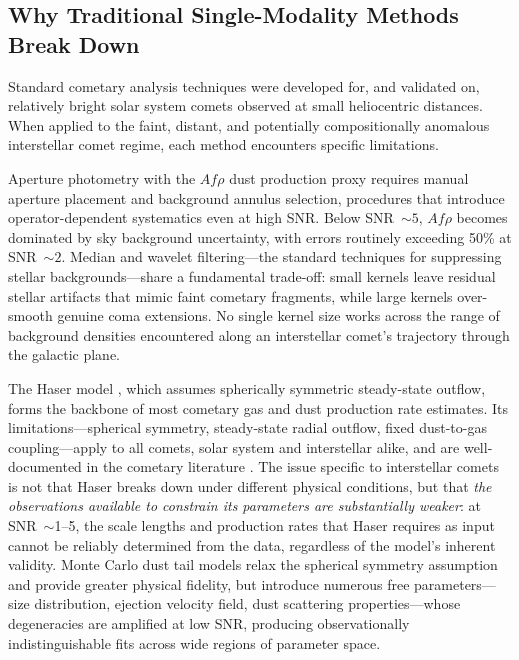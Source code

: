 \documentclass[usenatbib]{mnras}
\begin{document}
\subsection{Why Traditional Single-Modality Methods Break Down}

Standard cometary analysis techniques were developed for, and validated on, relatively bright solar system comets observed at small heliocentric distances. When applied to the faint, distant, and potentially compositionally anomalous interstellar comet regime, each method encounters specific limitations.

Aperture photometry with the $Af\rho$ dust production proxy \citep{lamy04,ahearn95} requires manual aperture placement and background annulus selection, procedures that introduce operator-dependent systematics even at high SNR. Below SNR~$\sim 5$, $Af\rho$ becomes dominated by sky background uncertainty, with errors routinely exceeding 50\% at SNR~$\sim 2$. Median and wavelet filtering---the standard techniques for suppressing stellar backgrounds---share a fundamental trade-off: small kernels leave residual stellar artifacts that mimic faint cometary fragments, while large kernels over-smooth genuine coma extensions. No single kernel size works across the range of background densities encountered along an interstellar comet's trajectory through the galactic plane.

The Haser model \citep{haser57}, which assumes spherically symmetric steady-state outflow, forms the backbone of most cometary gas and dust production rate estimates. Its limitations---spherical symmetry, steady-state radial outflow, fixed dust-to-gas coupling---apply to all comets, solar system and interstellar alike, and are well-documented in the cometary literature \citep{fulle10}. The issue specific to interstellar comets is not that Haser breaks down under different physical conditions, but that \textit{the observations available to constrain its parameters are substantially weaker}: at SNR~$\sim$1--5, the scale lengths and production rates that Haser requires as input cannot be reliably determined from the data, regardless of the model's inherent validity. Monte Carlo dust tail models \citep{fulle10} relax the spherical symmetry assumption and provide greater physical fidelity, but introduce numerous free parameters---size distribution, ejection velocity field, dust scattering properties---whose degeneracies are amplified at low SNR, producing observationally indistinguishable fits across wide regions of parameter space.
\end{document}
